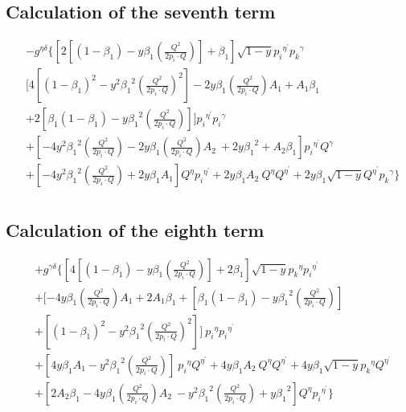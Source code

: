 \subsection*{Calculation of the seventh term}

\begin{equation}
\begin{split} 
&-g^{{{\eta}}{{\delta}}}\lbrace [2[(1-\beta_1)-y\beta_1 (\frac{Q^2}{2p_i \cdot Q})]+\beta_1 ] \sqrt{1-y}{p_i}^{{\eta}^{\prime}}{{p_k}^{{\gamma}}}\\
&[4[(1-\beta_1)^2-y^2 {\beta_1}^2 (\frac{Q^2}{2p_i \cdot Q})^2]-2y {\beta_1} (\frac{Q^2}{2p_i \cdot Q}) A_1 +A_1\beta_1 \\
&+2[\beta_1(1-\beta_1)-y {\beta_1}^2 (\frac{Q^2}{2p_i \cdot Q})]] {p_i}^{{\eta}^{\prime}}{p_i}^{{\gamma}}\\
&+[-4y^2 {\beta_1}^2 (\frac{Q^2}{2p_i \cdot Q})-2y {\beta_1} (\frac{Q^2}{2p_i \cdot Q}) A_2\: +2y {\beta_1}^2 +A_2\beta_1 ]{p_i}^{{\eta}^{\prime}}{Q}^{{\gamma}}\\
&+[-4y^2 {\beta_1}^2 (\frac{Q^2}{2p_i \cdot Q})+2y {\beta_1} A_1]{Q}^{{\eta}}{p_i}^{{\eta}^{\prime}}+2y {\beta_1} A_2 \:{Q}^{{\eta}}{Q}^{{\eta}^{\prime}}+2y {\beta_1}\sqrt{1-y}{Q}^{{\eta}^{\prime}}{{p_k}^{{\gamma}}}\rbrace\\
\end{split}
\end{equation}

\subsection*{Calculation of the eighth term}

\begin{equation}
\begin{split} 
&+g^{{{\gamma}}{{\delta}}}\lbrace
[4[(1-\beta_1)-y\beta_1 (\frac{Q^2}{2p_i \cdot Q})] +2\beta_1]\sqrt{1-y}{p_k}^{{\eta}}{{p_i}^{{\eta}^{\prime}}}\\
&+[-4y {\beta_1} (\frac{Q^2}{2p_i \cdot Q}) A_1+2A_1\beta_1 +[\beta_1(1-\beta_1)-y {\beta_1}^2 (\frac{Q^2}{2p_i \cdot Q})]\\
&+[(1-\beta_1)^2-y^2 {\beta_1}^2 (\frac{Q^2}{2p_i \cdot Q})^2]] \:{p_i}^{{\eta}}{p_i}^{{\eta}^{\prime}}\\
&+[4y {\beta_1} A_1 -y^2 {\beta_1}^2 (\frac{Q^2}{2p_i \cdot Q})]\:{p_i}^{{\eta}}{Q}^{{\eta}^{\prime}}+4y {\beta_1} A_2 \:{Q}^{{\eta}}{Q}^{{\eta}^{\prime}}+4y {\beta_1}\sqrt{1-y}{p_k}^{{\eta}}{{Q}^{{\eta}^{\prime}}}\\
&+[2A_2\beta_1-4y {\beta_1} (\frac{Q^2}{2p_i \cdot Q}) A_2\:-y^2 {\beta_1}^2 (\frac{Q^2}{2p_i \cdot Q})+y {\beta_1}^2] {Q}^{{\eta}}{{p_i}^{{\eta}^{\prime}}}\rbrace
\end{split}
\end{equation}

